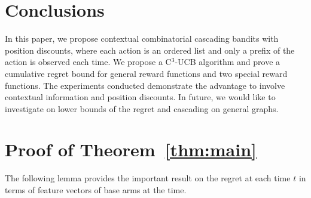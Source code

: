 \documentclass{article}
\begin{document}
\section{Conclusions}

In this paper, we propose contextual combinatorial cascading bandits with position discounts, where each action is an ordered list and only a prefix of the action is observed each time. We propose a C$^3$-UCB algorithm and prove a cumulative regret bound for general reward functions and two special reward functions. The experiments conducted demonstrate the advantage to involve contextual information and position discounts. In future, we would like to investigate on lower bounds of the regret and cascading on general graphs.



\newpage



\newpage

\appendix

\section{Proof of Theorem~\ref{thm:main}}

The following lemma provides the important result on the regret at each time $t$ in terms of feature vectors of base arms at the time.
\end{document}
